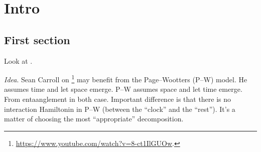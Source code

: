 \chapter{Intro}

\section{First section}

Look at \cite{
    CarrollMereo,
    ColafrancheschiPhD,
    szpak2014curved,
    Josset_2017_thermo,
    EinsteinFromEntanglement,
    speranza2018eeg,
    GRQO_2020,
    Shore_QGO,
    OQEG,
    QSimCurved,
    SpacetimeFromEntanglement,
    CMFT,
    SMQO1}.

\emph{Idea}. Sean Carroll on \footnote{ \url{https://www.youtube.com/watch?v=8-ct1IlGUOw}. }
may benefit from the Page--Wootters (P--W) model. He assumes time and let space emerge.
P--W assumes space and let time emerge. From entaanglement in both case. Important difference
is that there is no interaction Hamiltonin in P--W (between the ``clock'' and the ``rest'').
It's a matter of choosing the most ``appropriate'' decomposition.